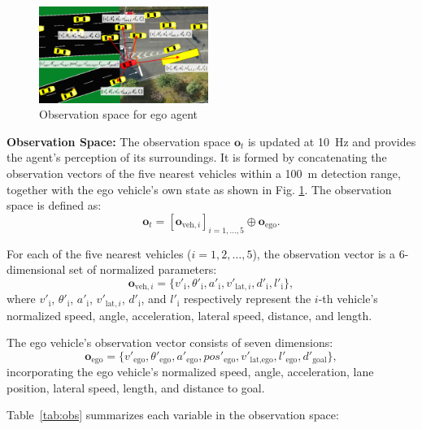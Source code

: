 \begin{figure}[H]
    \centering
    \includegraphics[width=0.49\textwidth]{fig/sim_set_up.png}
    \caption{Observation space for ego agent}
    \label{fig:sim_set_up} 
\end{figure}




\textbf{Observation Space:}
The observation space $\mathbf{o}_{t}$ is updated at \SI{10}{\hertz} and provides the agent's perception of its surroundings. It is formed by concatenating the observation vectors of the five nearest vehicles within a \SI{100}{\meter} detection range, together with the ego vehicle's own state as shown in Fig. \ref{fig:sim_set_up}. The observation space is defined as:
\begin{equation}
    \mathbf{o}_{t} = [\mathbf{o}_{\text{veh},i}]_{i=1, \ldots, 5} \oplus \mathbf{o}_{\text{ego}}.
\end{equation}

For each of the five nearest vehicles ($i = 1, 2, \ldots, 5$), the observation vector is a 6-dimensional set of normalized parameters:
\begin{equation}
    \mathbf{o}_{\text{veh},i} = \{v'_{\text{i}}, \theta'_{\text{i}}, a'_{\text{i}}, v'_{\text{lat},i}, d'_{\text{i}}, l'_{\text{i}}\},
\end{equation}
where $v'_{\text{i}}$, $\theta'_{\text{i}}$, $a'_{\text{i}}$, $v'_{\text{lat},i}$, $d'_{\text{i}}$, and $l'_{\text{i}}$ respectively represent the $i$-th vehicle's normalized speed, angle, acceleration, lateral speed, distance, and length.

The ego vehicle's observation vector consists of seven dimensions:
\begin{equation}
    \mathbf{o}_{\text{ego}} = \{v'_{\text{ego}}, \theta'_{\text{ego}}, a'_{\text{ego}}, pos'_{\text{ego}}, v'_{\text{lat,ego}}, l'_{\text{ego}}, d'_{\text{goal}}\},
\end{equation}
incorporating the ego vehicle's normalized speed, angle, acceleration, lane position, lateral speed, length, and distance to goal.

Table~\ref{tab:obs} summarizes each variable in the observation space:

